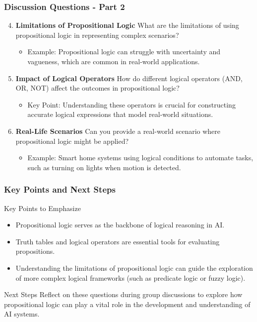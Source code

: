 \documentclass[aspectratio=169]{beamer}
\begin{document}
\begin{frame}[fragile]
    \frametitle{Discussion Questions - Part 2}
    \begin{enumerate}
        \setcounter{enumi}{3} %
        \item \textbf{Limitations of Propositional Logic}  
              What are the limitations of using propositional logic in representing complex scenarios?  
              \begin{itemize}
                  \item Example: Propositional logic can struggle with uncertainty and vagueness, which are common in real-world applications.
              \end{itemize}
        
        \item \textbf{Impact of Logical Operators}  
              How do different logical operators (AND, OR, NOT) affect the outcomes in propositional logic?  
              \begin{itemize}
                  \item Key Point: Understanding these operators is crucial for constructing accurate logical expressions that model real-world situations.
              \end{itemize}

        \item \textbf{Real-Life Scenarios}  
              Can you provide a real-world scenario where propositional logic might be applied?  
              \begin{itemize}
                  \item Example: Smart home systems using logical conditions to automate tasks, such as turning on lights when motion is detected.
              \end{itemize}
    \end{enumerate}
\end{frame}

\begin{frame}[fragile]
    \frametitle{Key Points and Next Steps}
    \begin{block}{Key Points to Emphasize}
        \begin{itemize}
            \item Propositional logic serves as the backbone of logical reasoning in AI.
            \item Truth tables and logical operators are essential tools for evaluating propositions.
            \item Understanding the limitations of propositional logic can guide the exploration of more complex logical frameworks (such as predicate logic or fuzzy logic).
        \end{itemize}
    \end{block}
    
    \begin{block}{Next Steps}
        Reflect on these questions during group discussions to explore how propositional logic can play a vital role in the development and understanding of AI systems.
    \end{block}
\end{frame}
\end{document}
